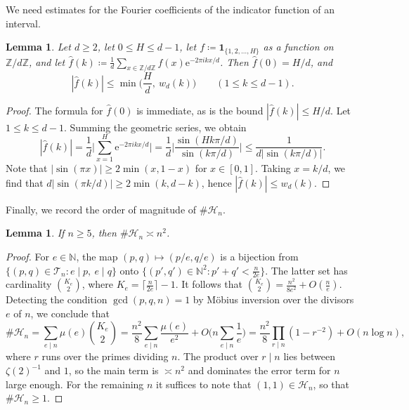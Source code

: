 \documentclass[12pt]{amsart}
\newtheorem{lemma}[theorem]{Lemma}
\theoremstyle{definition}
\newcommand{\Z}{\mathbb{Z}}
\newcommand{\e}{\mathrm{e}}
\newcommand{\N}{\mathbb{N}}
\begin{document}
We need estimates for the Fourier coefficients of the indicator function of an interval.

\begin{lemma}
\label{lem:intervalFourier}
Let $d\ge2$, let $0\le H\le d-1$, let $f\coloneq \mathbf{1}_{\{1,2,\dots,H\}}$ as a function on $\Z/d\Z$, and let $\widehat{f}(k)\coloneq \frac1d\sum_{x\in\Z/d\Z}f(x)\e^{-2\pi ikx/d}$.  Then $\widehat{f}(0)=H/d$, and
\[
|\widehat{f}(k)|\le\min\Big(\frac Hd,\ w_d(k)\Big)\qquad(1\le k\le d-1).
\]
\end{lemma}

\begin{proof}
The formula for $\widehat{f}(0)$ is immediate, as is the bound $|\widehat{f}(k)|\le H/d$.  Let $1\le k\le d-1$.  Summing the geometric series, we obtain
\[
|\widehat{f}(k)|=\frac1d\Big|\sum_{x=1}^{H}\e^{-2\pi ikx/d}\Big| =\frac{1}{d}\Big|\frac{\sin(H k \pi/d)}{\sin(k\pi/d)}\Big|\leq \frac{1}{d|\sin(k \pi/d)|}.
\]
Note that $|\sin(\pi x)|\ge2\min(x,1-x)$ for $x\in[0,1]$.  Taking $x=k/d$, we find that $d|\sin(\pi k/d)|\ge2\min(k,d-k)$, hence $|\widehat{f}(k)|\le w_d(k)$.
\end{proof}

Finally, we record the order of magnitude of $\#\mathcal{H}_n$.

\begin{lemma}
\label{lem:sizeHn}
If $n\geq 5$, then $\#\mathcal{H}_n\asymp n^2$.
\end{lemma}

\begin{proof}
For $e\in\N$, the map $(p,q)\mapsto(p/e,q/e)$ is a bijection from $\{(p,q)\in\mathcal{T}_n\colon e\mid p,~e\mid q\}$ onto $\{(p',q')\in\N^2\colon p'+q'<\frac{n}{2e}\}$.  The latter set has cardinality $\binom{K_e}{2}$, where $K_e= \lceil\frac{n}{2e}\rceil-1$.  It follows that $\binom{K_e}{2}=\frac{n^2}{8e^2}+O(\frac ne)$.  Detecting the condition $\gcd(p,q,n)=1$ by M\"obius inversion over the divisors $e$ of $n$, we conclude that
\[
\#\mathcal{H}_n=\sum_{e\mid n}\mu(e)\binom{K_e}{2} =\frac{n^2}{8}\sum_{e\mid n}\frac{\mu(e)}{e^2}+O\Big(n\sum_{e\mid n}\frac1e\Big)=\frac{n^2}{8}\prod_{r\mid n}(1-r^{-2})+O(n\log n),
\]
where $r$ runs over the primes dividing $n$.  The product over $r\mid n$ lies between $\zeta(2)^{-1}$ and $1$, so the main term is $\asymp n^2$ and dominates the error term for $n$ large enough.  For the remaining $n$ it suffices to note that $(1,1)\in\mathcal{H}_n$, so that $\#\mathcal{H}_n\ge1$.
\end{proof}
\end{document}

